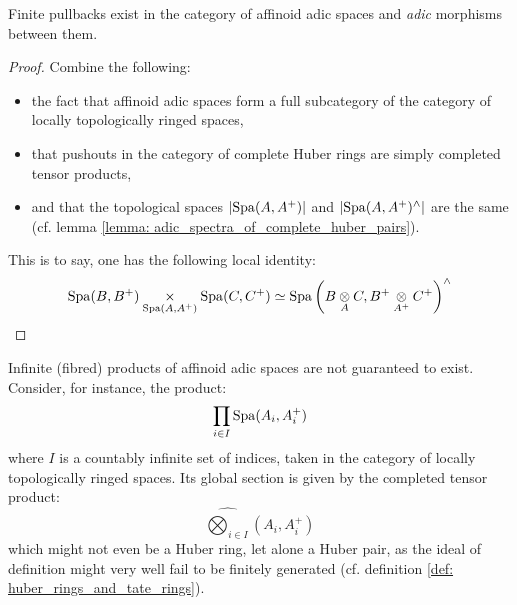                     \begin{proposition} \label{prop: pullbacks_of_affinoid_adic_spaces_along_adic_morphisms}
                        Finite pullbacks exist in the category of affinoid adic spaces and \textit{adic} morphisms between them.
                    \end{proposition}
                        \begin{proof}
                            Combine the following:
                                \begin{itemize}
                                    \item the fact that affinoid adic spaces form a full subcategory of the category of locally topologically ringed spaces,
                                    \item that pushouts in the category of complete Huber rings are simply completed tensor products,
                                    \item and that the topological spaces $|\mathrm{Spa}(A, A^+)|$ and $|\mathrm{Spa}(A, A^+)^{\wedge}|$ are the same (cf. lemma \ref{lemma: adic_spectra_of_complete_huber_pairs}).
                                \end{itemize}
                            This is to say, one has the following local identity:
                                $$\Spa(B, B^+) \x_{\Spa(A, A^+)} \Spa(C, C^+) \cong \Spa\left(B \tensor_A C, B^+ \tensor_{A^+} C^+\right)^{\wedge}$$
                        \end{proof}
                    \begin{remark}
                        Infinite (fibred) products of affinoid adic spaces are not guaranteed to exist. Consider, for instance, the product:
                            $$\prod_{i \in I} \mathrm{Spa}(A_i, A_i^+)$$
                        where $I$ is a countably infinite set of indices, taken in the category of locally topologically ringed spaces. Its global section is given by the completed tensor product:
                            $$\widehat{\bigotimes_{i \in I}} (A_i, A_i^+)$$
                        which might not even be a Huber ring, let alone a Huber pair, as the ideal of definition might very well fail to be finitely generated (cf. definition \ref{def: huber_rings_and_tate_rings}).  
                    \end{remark}
